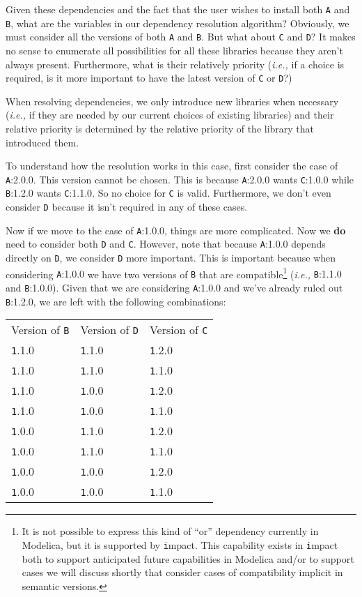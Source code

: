 \documentclass[11pt,a4paper,twocolumn]{article}
\newcommand{\code}[1]{\texttt{#1}} %
\begin{document}
Given these dependencies and the fact that the user wishes to install
both {\code A} and {\code B}, what are the variables in our dependency
resolution algorithm?  Obviously, we must consider all the versions of
both {\code A} and {\code B}.  But what about {\code C} and {\code D}?
It makes no sense to enumerate all possibilities for all these
libraries because they aren't always present.  Furthermore, what is
their relatively priority ({\it i.e.,} if a choice is required, is it
more important to have the latest version of {\code C} or {\code D}?)

When resolving dependencies, we only introduce new libraries when
necessary ({\it i.e.,} if they are needed by our current choices of
existing libraries) and their relative priority is determined by the
relative priority of the library that introduced them.

To understand how the resolution works in this case, first consider
the case of {\code A:2.0.0}.  This version cannot be chosen.  This is
because {\code A:2.0.0} wants {\code C:1.0.0} while {\code B:1.2.0}
wants {\code C:1.1.0}.  So no choice for {\code C} is valid.
Furthermore, we don't even consider {\code D} because it isn't
required in any of these cases.

Now if we move to the case of {\code A:1.0.0}, things are more
complicated.  Now we {\bf do} need to consider both {\code D} and
{\code C}.  However, note that because {\code A:1.0.0} depends
directly on {\code D}, we consider {\code D} more important.  This is
important because when considering {\code A:1.0.0} we have two
versions of {\code B} that are compatible\footnote{It is not possible
  to express this kind of ``or'' dependency currently in Modelica, but
  it is supported by {\code impact}.  This capability exists in {\code
    impact} both to support anticipated future capabilities in
  Modelica \cite{} and/or to support cases we will discuss shortly
  that consider cases of compatibility implicit in semantic versions.}
({\it i.e.,} {\code B:1.1.0} and {\code B:1.0.0}).  Given that we are
considering {\code A:1.0.0} and we've already ruled out {\code
  B:1.2.0}, we are left with the following combinations:

\begin{tabular}{ l l l }
  Version of {\code B} & Version of {\code D} & Version of {\code C} \\
  {\code 1.1.0} & {\code 1.1.0} & {\code 1.2.0} \\
  {\code 1.1.0} & {\code 1.1.0} & {\code 1.1.0} \\
  {\code 1.1.0} & {\code 1.0.0} & {\code 1.2.0} \\
  {\code 1.1.0} & {\code 1.0.0} & {\code 1.1.0} \\
  {\code 1.0.0} & {\code 1.1.0} & {\code 1.2.0} \\
  {\code 1.0.0} & {\code 1.1.0} & {\code 1.1.0} \\
  {\code 1.0.0} & {\code 1.0.0} & {\code 1.2.0} \\
  {\code 1.0.0} & {\code 1.0.0} & {\code 1.1.0} \\
\end{tabular}
\end{document}
